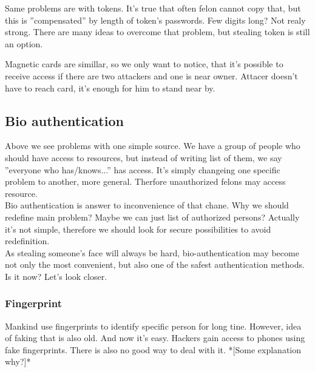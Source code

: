             Same problems are with tokens.
            It's true that often felon cannot copy that,
            but this is ''compensated'' by length of token's passwords.
            Few digits long? Not realy strong.
            There are many ideas to overcome that problem,
            but stealing token is still an option.

            Magnetic cards are simillar, so we only want to notice,
            that it's possible to receive access if there are
            two attackers and one is near owner.
            Attacer doesn't have to reach card, it's enough
            for him to stand near by. %

    \subsection{Bio authentication}
        Above we see problems with one simple source.
        We have a group of people who should have access to resources,
        but instead of writing list of them, we
        say ''everyone who has/knows...'' has access.
        It's simply changeing one specific problem to another,
        more general. Therfore unauthorized felons may
        access resource.\\
        Bio authentication is answer to inconvenience of that chane.
        Why we should redefine main problem? Maybe we
        can just list of authorized persons?
        Actually it's not simple, therefore we should
        look for secure possibilities to avoid redefinition.\\
        As stealing someone's face will always be hard,
        bio-authentication may become not only the most
        convenient, but also one of the safest
        authentication methods.\\
        Is it now? Let's look closer.

        \subsubsection*{Fingerprint}
            Mankind use fingerprints to identify specific person
            for long tine. %
            However, idea of faking that is also old. %
            And now it's easy. %
            Hackers gain access to phones
            using fake fingerprints. %
            There is also no good way
            to deal with it.
            *[Some explanation why?]* %

